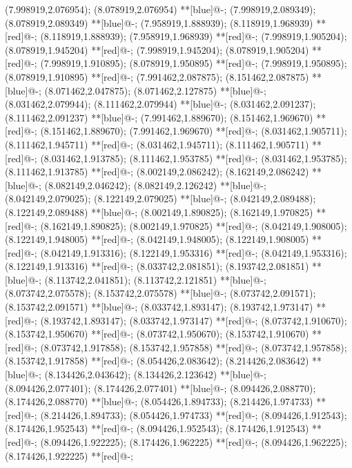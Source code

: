 (7.998919,2.076954); (8.078919,2.076954) **[blue]@{-};
(7.998919,2.089349); (8.078919,2.089349) **[blue]@{-};
(7.958919,1.888939); (8.118919,1.968939) **[red]@{-};
(8.118919,1.888939); (7.958919,1.968939) **[red]@{-};
(7.998919,1.905204); (8.078919,1.945204) **[red]@{-};
(7.998919,1.945204); (8.078919,1.905204) **[red]@{-};
(7.998919,1.910895); (8.078919,1.950895) **[red]@{-};
(7.998919,1.950895); (8.078919,1.910895) **[red]@{-};
(7.991462,2.087875); (8.151462,2.087875) **[blue]@{-};
(8.071462,2.047875); (8.071462,2.127875) **[blue]@{-};
(8.031462,2.079944); (8.111462,2.079944) **[blue]@{-};
(8.031462,2.091237); (8.111462,2.091237) **[blue]@{-};
(7.991462,1.889670); (8.151462,1.969670) **[red]@{-};
(8.151462,1.889670); (7.991462,1.969670) **[red]@{-};
(8.031462,1.905711); (8.111462,1.945711) **[red]@{-};
(8.031462,1.945711); (8.111462,1.905711) **[red]@{-};
(8.031462,1.913785); (8.111462,1.953785) **[red]@{-};
(8.031462,1.953785); (8.111462,1.913785) **[red]@{-};
(8.002149,2.086242); (8.162149,2.086242) **[blue]@{-};
(8.082149,2.046242); (8.082149,2.126242) **[blue]@{-};
(8.042149,2.079025); (8.122149,2.079025) **[blue]@{-};
(8.042149,2.089488); (8.122149,2.089488) **[blue]@{-};
(8.002149,1.890825); (8.162149,1.970825) **[red]@{-};
(8.162149,1.890825); (8.002149,1.970825) **[red]@{-};
(8.042149,1.908005); (8.122149,1.948005) **[red]@{-};
(8.042149,1.948005); (8.122149,1.908005) **[red]@{-};
(8.042149,1.913316); (8.122149,1.953316) **[red]@{-};
(8.042149,1.953316); (8.122149,1.913316) **[red]@{-};
(8.033742,2.081851); (8.193742,2.081851) **[blue]@{-};
(8.113742,2.041851); (8.113742,2.121851) **[blue]@{-};
(8.073742,2.075578); (8.153742,2.075578) **[blue]@{-};
(8.073742,2.091571); (8.153742,2.091571) **[blue]@{-};
(8.033742,1.893147); (8.193742,1.973147) **[red]@{-};
(8.193742,1.893147); (8.033742,1.973147) **[red]@{-};
(8.073742,1.910670); (8.153742,1.950670) **[red]@{-};
(8.073742,1.950670); (8.153742,1.910670) **[red]@{-};
(8.073742,1.917858); (8.153742,1.957858) **[red]@{-};
(8.073742,1.957858); (8.153742,1.917858) **[red]@{-};
(8.054426,2.083642); (8.214426,2.083642) **[blue]@{-};
(8.134426,2.043642); (8.134426,2.123642) **[blue]@{-};
(8.094426,2.077401); (8.174426,2.077401) **[blue]@{-};
(8.094426,2.088770); (8.174426,2.088770) **[blue]@{-};
(8.054426,1.894733); (8.214426,1.974733) **[red]@{-};
(8.214426,1.894733); (8.054426,1.974733) **[red]@{-};
(8.094426,1.912543); (8.174426,1.952543) **[red]@{-};
(8.094426,1.952543); (8.174426,1.912543) **[red]@{-};
(8.094426,1.922225); (8.174426,1.962225) **[red]@{-};
(8.094426,1.962225); (8.174426,1.922225) **[red]@{-};
